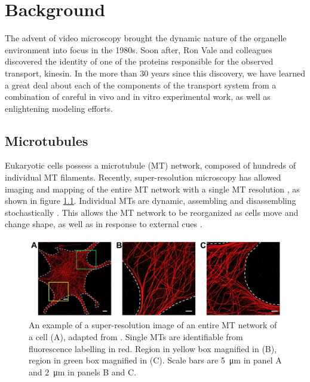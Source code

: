 \chapter{Background} \label{ch:background}

The advent of video microscopy brought the dynamic nature of the organelle environment into focus in the 1980s. Soon after, Ron Vale and colleagues discovered the identity of one of the proteins responsible for the observed transport, kinesin. In the more than 30 years since this discovery, we have learned a great deal about each of the components of the transport system from a combination of careful in vivo and in vitro experimental work, as well as enlightening modeling efforts.

\section{Microtubules}

Eukaryotic cells possess a microtubule (MT) network, composed of hundreds of individual MT filaments. Recently, super-resolution microscopy has allowed imaging and mapping of the entire MT network with a single MT resolution \cite{Zhang2016}, as shown in figure \ref{fig:MTcytoskeleton}. Individual MTs are dynamic, assembling and disassembling stochastically \cite{Howard2003}. This allows the MT network to be reorganized as cells move and change shape, as well as in response to external cues \cite{Herms2015,Zhu2015,Zhang2016}. 

\begin{figure}
\centering
\includegraphics[scale=.5]{background/MTcytoskeleton}
\caption[Super-resolution image of a MT network]{An example of a super-resolution image of an entire MT network of a cell (A), adapted from \cite{Zhang2016}. Single MTs are identifiable from fluorescence labelling in red. Region in yellow box magnified in (B), region in green box magnified in (C). Scale bars are \SI{5}{\micro\meter} in panel A and \SI{2}{\micro\meter} in panels B and C.}
\label{fig:MTcytoskeleton}
\end{figure}

